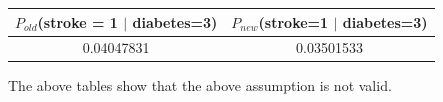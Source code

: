\documentclass[11pt]{article}
\begin{document}
\begin{table}[!hbt]
\begin{center}
\begin{tabular}{ |c|c| }
  \hline
  $P_{old}$(stroke = 1 $|$ diabetes=3) & $P_{new}$(stroke=1 $|$ diabetes=3) \\
  \hline
  0.04047831 & 0.03501533 \\
  \hline
\end{tabular}
\end{center}
\end{table}

The above tables show that the above assumption is not valid.
\end{document}
